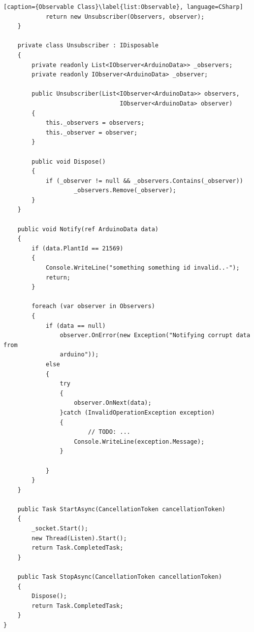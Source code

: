 \documentclass[a4paper,12pt,twoside,openright,titlepage]{book}
\begin{document}
\begin{lstlisting}[caption={Observable Class}\label{list:Observable}, language=CSharp]
            return new Unsubscriber(Observers, observer);
    }

	private class Unsubscriber : IDisposable
	{
		private readonly List<IObserver<ArduinoData>> _observers;
	    private readonly IObserver<ArduinoData> _observer;

        public Unsubscriber(List<IObserver<ArduinoData>> observers,
        						 IObserver<ArduinoData> observer)
		{
			this._observers = observers;
			this._observer = observer;
		}
		
		public void Dispose()
		{
			if (_observer != null && _observers.Contains(_observer))
					_observers.Remove(_observer);
        }
	}

	public void Notify(ref ArduinoData data)
	{
		if (data.PlantId == 21569)
		{
			Console.WriteLine("something something id invalid..-");
            return;
		}
            
		foreach (var observer in Observers)
		{
			if (data == null)
				observer.OnError(new Exception("Notifying corrupt data from
				arduino"));
			else
			{
				try
				{
					observer.OnNext(data);
				}catch (InvalidOperationException exception)
				{
                        // TODO: ...
					Console.WriteLine(exception.Message);
				}

			}
		}
	}

	public Task StartAsync(CancellationToken cancellationToken)
	{
		_socket.Start();
	    new Thread(Listen).Start();
        return Task.CompletedTask;
	}

	public Task StopAsync(CancellationToken cancellationToken)
	{
		Dispose();
	    return Task.CompletedTask;
    }
}
\end{lstlisting}
\end{document}
